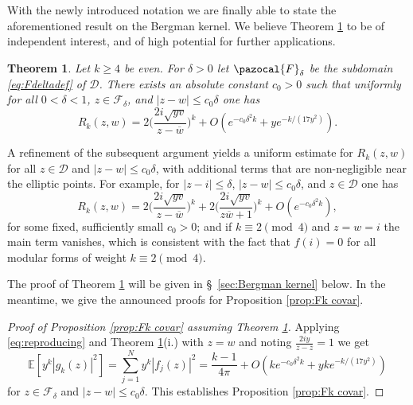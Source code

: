 \documentclass[12pt, a4paper]{amsart}
\newtheorem{theorem}{Theorem}[section]
\theoremstyle{definition}
\newcommand {\1} {\mathbf{1}}
\newcommand {\Dc} {\mathcal{D}}
\newcommand {\Fc} {\pazocal{F}}
\numberwithin{equation}{section}
\begin{document}
\vspace{2mm}

With
the newly introduced notation we are finally able to state the aforementioned result on the Bergman kernel. We believe
Theorem \ref{thm:bergman} to be of independent interest, and of high potential for further applications.

\begin{theorem} \label{thm:bergman}
Let $k \ge 4$ be even.
For $\delta >0$ let $\Fc_{\delta}$ be the subdomain \eqref{eq:Fdeltadef} of $\Dc$. There exists an absolute constant $c_0>0$ such that
uniformly for all $0<\delta<1$, $z \in \mathcal F_{\delta}$, and $|z-w|\le c_0 \delta$ one has
\[
R_k(z,w)=2 \bigg(\frac{2i \sqrt{yv}}{z-\overline w}  \bigg)^k+O(e^{-c_0 \delta^2 k}+y e^{-k/(17y^2)}).
\]
\end{theorem}


\vspace{2mm}

A refinement of the subsequent argument yields a uniform estimate for $R_k(z,w)$ for all $z \in \Dc$ and $|z-w| \le c_0 \delta$, with additional terms that are non-negligible near the elliptic points. For example, for $|z-i|\le \delta$, $|z-w| \le c_0 \delta$, and $z \in \Dc$ one has
\[
R_k(z,w)=2 \bigg(\frac{2i \sqrt{yv}}{z-\overline w}  \bigg)^k+2\bigg(\frac{2i \sqrt{yv}}{z \overline w+1} \bigg)^k+O(e^{-c_0 \delta^2 k}),
\]
for some fixed, sufficiently small $c_0>0$; and if $k \equiv 2 \pmod 4$ and $z=w=i$ the main term vanishes,
which is consistent with the fact that $f(i)=0$ for all modular forms of weight $k \equiv 2 \pmod 4$.

\vspace{2mm}

The proof of Theorem \ref{thm:bergman} will be given in \S~\ref{sec:Bergman kernel} below. In the meantime, we give the announced proofs
for Proposition \ref{prop:Fk covar}.

\begin{proof}[Proof of Proposition \ref{prop:Fk covar} assuming Theorem \ref{thm:bergman}]
Applying \eqref{eq:reproducing} and
Theorem \ref{thm:bergman}(i.) with $z=w$ and noting $\tfrac{2i y}{z-\overline z}=1$ we get
\[
\mathbb E[ y^{k} |g_k(z)|^2]= \sum_{j=1}^N y^{k} |f_j(z)|^2 = \frac{k-1}{4\pi }+O(ke^{-c_0 \delta^2 k}+yk e^{-k/(17y^2)})
\]
for $z \in \mathcal F_{\delta}$ and $|z-w| \le c_0 \delta$. This establishes Proposition \ref{prop:Fk covar}. \end{proof}
\end{document}

